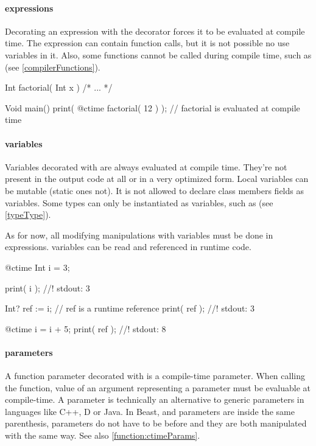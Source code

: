 \paragraph{\ctime expressions}
Decorating an expression with the \ctime decorator forces it to be evaluated at compile time. The expression can contain function calls, but it is not possible no use \nonctime variables in it. Also, some functions cannot be called during compile time, such as  (see \autoref{compilerFunctions}).

\begin{code}
Int factorial( Int x ) { /* ... */ }
	
Void main() {
	print( @ctime factorial( 12 ) ); // factorial is evaluated at compile time
}
\end{code}

\paragraph{\ctime variables}
Variables decorated with \ctime are always evaluated at compile time. They're not present in the output code at all or in a very optimized form. Local \ctime variables can be mutable (static ones not). It is not allowed to declare class members fields as \ctime variables. Some types can only be instantiated as \ctime variables, such as  (see \autoref{typeType}).

As for now, all modifying manipulations with \ctime variables must be done in \ctime expressions. \ctime variables can be read and referenced in runtime code.

\begin{code}
@ctime Int i = 3;

print( i ); //! stdout: 3

Int? ref := i; // ref is a runtime reference
print( ref ); //! stdout: 3

@ctime i = i + 5;
print( ref ); //! stdout: 8
\end{code}

\paragraph{ parameters}
A function parameter decorated with  is a compile-time parameter. When calling the function, value of an argument representing a \ctime parameter must be evaluable at compile-time. A \ctime parameter is technically an alternative to generic parameters in languages like C++, D or Java. In Beast, \ctime and \nonctime parameters are inside the same parenthesis, \ctime parameters do not have to be before \nonctime and they are both manipulated with the same way. See also \autoref{function:ctimeParams}.

